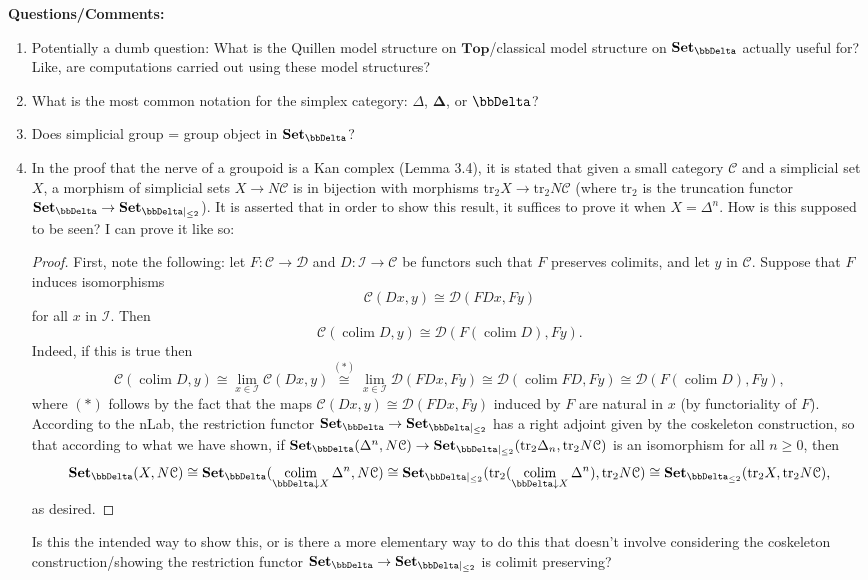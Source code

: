 \documentclass{amsart}
\newcommand{\bDelta}{\mathbf{\Delta}}
\theoremstyle{plain}
\theoremstyle{definition}
\newcommand{\Top}{\mbf{Top}}
\newcommand{\Set}{\mbf{Set}}
\newcommand{\0}{\mathbf{0}}
\newcommand{\cC}{\mathcal C}
\newcommand{\cD}{\mathcal D}
\newcommand{\cI}{\mathcal I}
\newcommand{\mbf}[1]{\mathbf{#1}}
\renewcommand{\(}{\left(}
\renewcommand{\)}{\right)}
\DeclareMathOperator*{\colim}{colim}
\begin{document}
\textbf{Questions/Comments:}\begin{enumerate}
  \item Potentially a dumb question: What is the Quillen model structure on $\Top$/classical model structure on $\Set_\bbDelta$ actually useful for? Like, are computations carried out using these model structures?
  \item What is the most common notation for the simplex category: $\Delta$, $\bDelta$, or $\bbDelta$?
  \item Does simplicial group = group object in $\Set_\bbDelta$?
  \item In the proof that the nerve of a groupoid is a Kan complex (Lemma 3.4), it is stated that given a small category $\cC$ and a simplicial set $X$, a morphism of simplicial sets $X\to N\cC$ is in bijection with morphisms $\mathrm{tr}_2X\to\mathrm{tr}_2N\cC$ (where $\mathrm{tr}_2$ is the truncation functor $\Set_\bbDelta\to\Set_{\bbDelta|_{\leq 2}}$). It is asserted that in order to show this result, it suffices to prove it when $X=\Delta^n$. How is this supposed to be seen? I can prove it like so:
  \begin{proof}
	First, note the following: let $F:\cC\to\cD$ and $D:\cI\to\cC$ be functors such that $F$ preserves colimits, and let $y$ in $\cC$. Suppose that $F$ induces isomorphisms
	\[\cC(Dx,y)\cong\cD(FDx,Fy)\]
	for all $x$ in $\cI$. Then
	\[\cC(\colim D,y)\cong\cD(F(\colim D),Fy).\]
	Indeed, if this is true then
	\[\cC(\colim D,y)\cong\lim_{x\in\cI}\cC(Dx,y)\overset{(\ast)}\cong\lim_{x\in\cI}\cD(FDx,Fy)\cong\cD(\colim FD,Fy)\cong\cD(F(\colim D),Fy),\]
	where $(\ast)$ follows by the fact that the maps $\cC(Dx,y)\cong\cD(FDx,Fy)$ induced by $F$ are natural in $x$ (by functoriality of $F$). According to the nLab, the restriction functor $\Set_{\bbDelta}\to\Set_{\bbDelta|_{\leq2}}$ has a right adjoint given by the coskeleton construction, so that according to what we have shown, if $\Set_\bbDelta(\Delta^n,N\cC)\to\Set_{\bbDelta|_{\leq2}}(\mathrm{tr}_2\Delta_n,\mathrm{tr}_2N\cC)$ is an isomorphism for all $n\geq0$, then
	\[\Set_\bbDelta(X,N\cC)\cong\Set_\bbDelta(\colim_{\bbDelta\downarrow X}\Delta^n,N\cC)\cong\Set_{\bbDelta|_{\leq2}}(\mathrm{tr}_2(\colim_{\bbDelta\downarrow X}\Delta^n),\mathrm{tr}_2N\cC)\cong\Set_{\bbDelta_{\leq2}}(\mathrm{tr}_2X,\mathrm{tr}_2N\cC),\]
	as desired.
  \end{proof}
  Is this the intended way to show this, or is there a more elementary way to do this that doesn't involve considering the coskeleton construction/showing the restriction functor $\Set_\bbDelta\to\Set_{\bbDelta|_{\leq2}}$ is colimit preserving?

\end{enumerate}
\end{document}
